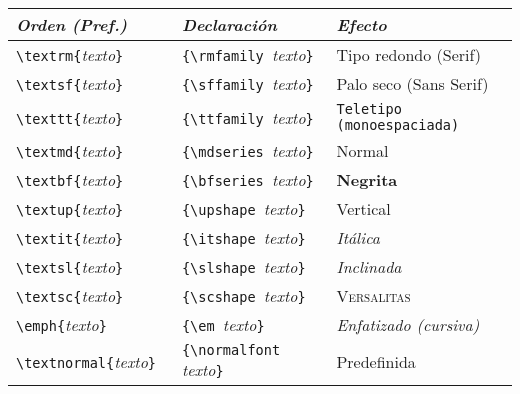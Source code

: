 \documentclass[10pt,landscape,a4paper]{article}
\makeatletter
\renewcommand{\subsection}{\@startsection{subsection}{2}{0mm}%
                                {-1explus -.5ex minus -.2ex}%
                                {0.5ex plus .2ex}%
                                {\normalfont\normalsize\bfseries}}
\makeatother
\begin{document}
\begin{multicols}{3}
\newcommand{\FontCmd}[3]{\PBS\verb!\#1{!\emph{texto}\verb!}!  \> %
                         \verb!{\#2 !\emph{texto}\verb!}! \> %
                         \#1{#3}}
\begin{tabular}{@{}l@{}l@{}l@{}}
\emph{Orden (Pref.)}  & \emph{Declaración} & \emph{Efecto} \\ \hline
\verb!\textrm{!\emph{texto}\verb!}!                    & %
        \verb!{\rmfamily !\emph{texto}\verb!}    !               & %
        \textrm{Tipo redondo (Serif)} \\
\verb!\textsf{!\emph{texto}\verb!}!                    & %
        \verb!{\sffamily !\emph{texto}\verb!}!               & %
        \textsf{Palo seco (Sans Serif)} \\
\verb!\texttt{!\emph{texto}\verb!}!                    & %
        \verb!{\ttfamily !\emph{texto}\verb!}!               & %
        \texttt{Teletipo (monoespaciada)} \\
\verb!\textmd{!\emph{texto}\verb!}!                    & %
        \verb!{\mdseries !\emph{texto}\verb!}!               & %
        \textmd{Normal} \\
\verb!\textbf{!\emph{texto}\verb!}!                    & %
        \verb!{\bfseries !\emph{texto}\verb!}!               & %
        \textbf{Negrita} \\
\verb!\textup{!\emph{texto}\verb!}!                    & %
        \verb!{\upshape !\emph{texto}\verb!}!               & %
        \textup{Vertical} \\
\verb!\textit{!\textit{texto}\verb!}!                    & %
        \verb!{\itshape !\emph{texto}\verb!}!               & %
        \emph{Itálica} \\
\verb!\textsl{!\emph{texto}\verb!}!                    & %
        \verb!{\slshape !\emph{texto}\verb!}!               & %
        \textsl{Inclinada} \\
\verb!\textsc{!\emph{texto}\verb!}!                    & %
        \verb!{\scshape !\emph{texto}\verb!}!               & %
        \textsc{Versalitas} \\
\verb!\emph{!\emph{texto}\verb!}!                      & %
        \verb!{\em !\emph{texto}\verb!}!               & %
        \emph{Enfatizado (cursiva)} \\
\verb!\textnormal{!\emph{texto}\verb!}  !                & %
        \verb!{\normalfont !\emph{texto}\verb!}!       & %
        \textnormal{Predefinida} \\[0.7mm]
\end{tabular}


\end{multicols}
\end{document}
